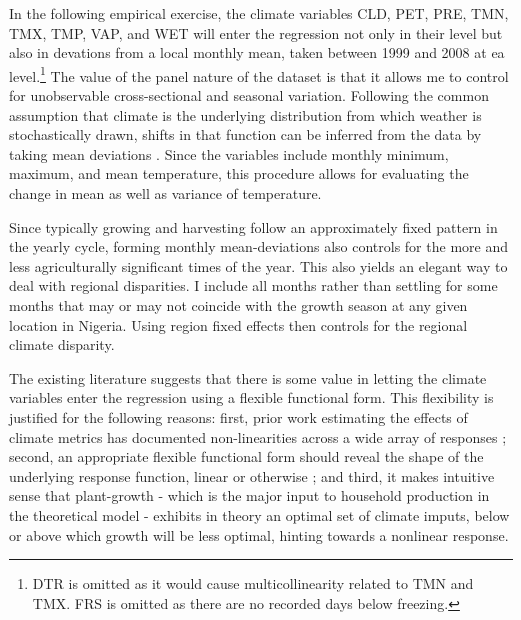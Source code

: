 \documentclass[a4paper,12pt]{article}
\theoremstyle{plain}
\theoremstyle{definition}
\theoremstyle{definition}
\theoremstyle{definition}
\theoremstyle{definition}
\begin{document}
In the following empirical exercise, the climate variables CLD, PET, PRE, TMN, TMX, TMP, VAP, and WET will enter the regression not only in their level but also in devations from a local monthly mean, taken between 1999 and 2008 at ea level.\footnote{DTR is omitted as it would cause multicollinearity related to TMN and TMX. FRS is omitted as there are no recorded days below freezing.} The value of the panel nature of the dataset is that it allows me to control for unobservable cross-sectional and seasonal variation. Following the common assumption that climate is the underlying distribution from which weather is stochastically drawn, shifts in that function can be inferred from the data by taking mean deviations \citet{Auffhammer2013,Hsiang2016a, Hsiang2018}. Since the variables include monthly minimum, maximum, and mean temperature, this procedure allows for evaluating the change in mean as well as variance of temperature.

Since typically growing and harvesting follow an approximately fixed pattern in the yearly cycle, forming monthly mean-deviations also controls for the more and less agriculturally significant times of the year. This also yields an elegant way to deal with regional disparities. I include all months rather than settling for some months that may or may not coincide with the growth season at any given location in Nigeria. Using region fixed effects then controls for the regional climate disparity.

The existing literature suggests that there is some value in letting the climate variables enter the regression using a flexible functional form. This flexibility is justified for the following reasons: first, prior work estimating the effects of climate metrics has documented non-linearities across a wide array of responses \citep{Carleton2016}; second, an appropriate flexible functional form should reveal the shape of the underlying response function, linear or otherwise \citep{Hsiang2016a}; and third, it makes intuitive sense that plant-growth - which is the major input to household production in the theoretical model - exhibits in theory an optimal set of climate imputs, below or above which growth will be less optimal, hinting towards a nonlinear response.
\end{document}
